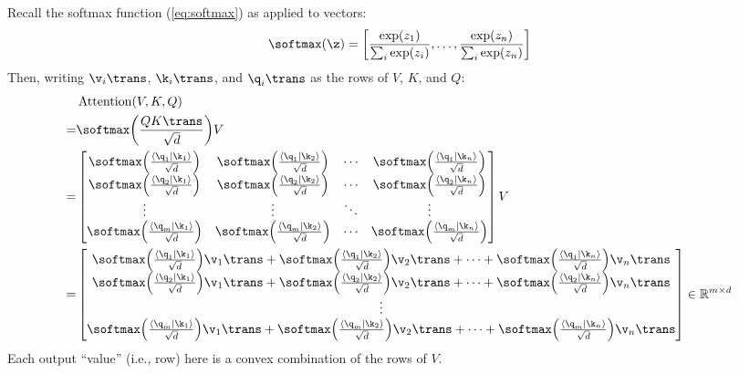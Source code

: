 \documentclass[class=cs480,notes,tikz]{agony}
\begin{document}
Recall the softmax function (\cref{eq:softmax}) as applied to vectors:
\[ \softmax(\z) = \qty[\frac{\exp(z_1)}{\sum_i \exp(z_i)},\dotsc,\frac{\exp(z_n)}{\sum_i \exp(z_n)}] \]
Then, writing $\v_i\trans$, $\k_i\trans$, and $\q_i\trans$ as the rows of $V$, $K$, and $Q$:
\begin{align*}
    & \operatorname{Attention}(V,K,Q)                                                                                                                                                                                                                                                                                                                              \\
  = & \softmax\qty(\frac{QK\trans}{\sqrt d})V                                                                                                                                                                                                                                                                                                                      \\
  = & \begin{bmatrix}
        \softmax\qty(\frac{\ip{\q_1}{\k_1}}{\sqrt d}) & \softmax\qty(\frac{\ip{\q_1}{\k_2}}{\sqrt d}) & \cdots & \softmax\qty(\frac{\ip{\q_1}{\k_n}}{\sqrt d}) \\
        \softmax\qty(\frac{\ip{\q_2}{\k_1}}{\sqrt d}) & \softmax\qty(\frac{\ip{\q_2}{\k_2}}{\sqrt d}) & \cdots & \softmax\qty(\frac{\ip{\q_2}{\k_n}}{\sqrt d}) \\
        \vdots                                        & \vdots                                        & \ddots & \vdots                                        \\
        \softmax\qty(\frac{\ip{\q_m}{\k_1}}{\sqrt d}) & \softmax\qty(\frac{\ip{\q_m}{\k_2}}{\sqrt d}) & \cdots & \softmax\qty(\frac{\ip{\q_m}{\k_n}}{\sqrt d})
      \end{bmatrix}V                               \\
  = & \begin{bmatrix}
        \softmax\qty(\frac{\ip{\q_1}{\k_1}}{\sqrt d})\v_1\trans + \softmax\qty(\frac{\ip{\q_1}{\k_2}}{\sqrt d})\v_2\trans + \dotsb + \softmax\qty(\frac{\ip{\q_1}{\k_n}}{\sqrt d})\v_n\trans \\
        \softmax\qty(\frac{\ip{\q_2}{\k_1}}{\sqrt d})\v_1\trans + \softmax\qty(\frac{\ip{\q_2}{\k_2}}{\sqrt d})\v_2\trans + \dotsb + \softmax\qty(\frac{\ip{\q_2}{\k_n}}{\sqrt d})\v_n\trans \\
        \vdots                                                                                                                                                                               \\
        \softmax\qty(\frac{\ip{\q_m}{\k_1}}{\sqrt d})\v_1\trans + \softmax\qty(\frac{\ip{\q_m}{\k_2}}{\sqrt d})\v_2\trans + \dotsb + \softmax\qty(\frac{\ip{\q_m}{\k_n}}{\sqrt d})\v_n\trans
      \end{bmatrix} \in \R^{m \times d}
\end{align*}
Each output ``value'' (i.e., row) here is a convex combination of the rows of $V$.
\end{document}
